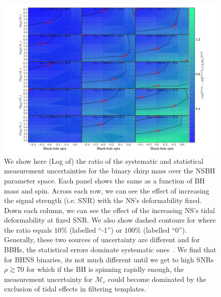 \documentclass[aps,prd,amsmath,floats,floatfix, twocolumn,
superscriptaddress,nofootinbib,showpacs]{revtex4-1}
\newcommand{\mchirp}{\mathcal{M}_c}
\begin{document}
\begin{figure}
\centering 
\includegraphics[trim={1.3cm 0 0 0},width=2.\columnwidth]{plots/TNMchirpBiasesOverCIWidths_CI90_0_Lambda_SNR30_70_linear}
\caption{We show here (Log of) the ratio of the systematic and statistical
measurement uncertainties for the binary chirp mass over the NSBH parameter 
space. Each panel shows the same as a function of BH mass and spin. Across
each row, we can see the effect of increasing the signal strength (i.e. SNR)
with the NS's deformability fixed. Down each column, we can see 
the effect of the increasing NS's tidal deformability at fixed SNR. We also
show dashed contours for where the ratio equals $10\%$ (labelled ``-1'')
or $100\%$ (labelled ``0'').
% 
Generally, these two sources of uncertainty are different and for BBHs, the
statistical errors dominate systematic ones~\cite{Kumar:2016dhh}. We find
that for BHNS binaries, its not much different until we get to high SNRs
$\rho\gtrsim 70$ for which if the BH is spinning rapidly enough, the 
measurement uncertainty for $\mchirp$ could become dominated by the exclusion
of tidal effects in filtering templates.
}
\label{fig:TN_chirpMassBias_vs_Lambda_SNR}
\end{figure}
%
\end{document}

